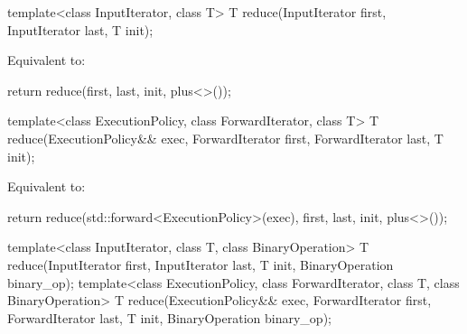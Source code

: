 %
\begin{itemdecl}
template<class InputIterator, class T>
  T reduce(InputIterator first, InputIterator last, T init);
\end{itemdecl}

\begin{itemdescr}
\pnum
\effects Equivalent to:
\begin{codeblock}
return reduce(first, last, init, plus<>());
\end{codeblock}
\end{itemdescr}

%
\begin{itemdecl}
template<class ExecutionPolicy, class ForwardIterator, class T>
  T reduce(ExecutionPolicy&& exec,
           ForwardIterator first, ForwardIterator last, T init);
\end{itemdecl}

\begin{itemdescr}
\pnum
\effects Equivalent to:
\begin{codeblock}
return reduce(std::forward<ExecutionPolicy>(exec), first, last, init, plus<>());
\end{codeblock}
\end{itemdescr}


%
\begin{itemdecl}
template<class InputIterator, class T, class BinaryOperation>
  T reduce(InputIterator first, InputIterator last, T init,
           BinaryOperation binary_op);
template<class ExecutionPolicy, class ForwardIterator, class T, class BinaryOperation>
  T reduce(ExecutionPolicy&& exec,
           ForwardIterator first, ForwardIterator last, T init,
           BinaryOperation binary_op);
\end{itemdecl}

